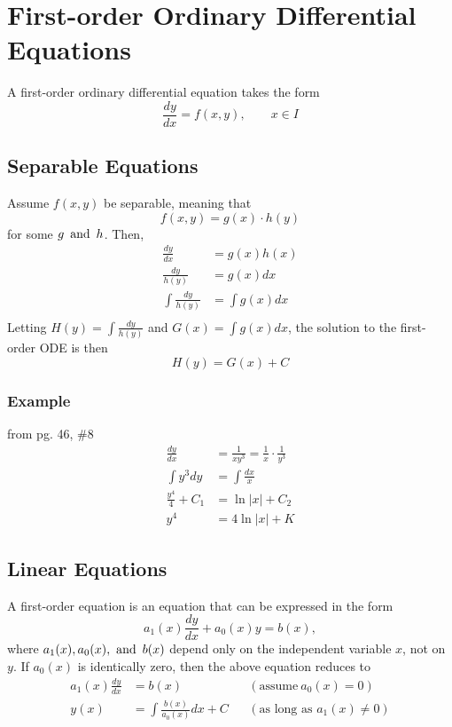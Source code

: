 \section{First-order Ordinary Differential Equations}
A first-order ordinary differential equation takes the form
\[
    \frac{dy}{dx} = f(x,y), \qquad x \in I
\]

\subsection{Separable Equations}
Assume $f(x,y)$ be separable, meaning that
\[
    f(x,y) = g(x)\cdot h(y)
\]
for some $g \operatorname{~\text{and}~} h$. Then,
\begin{align*}
    \frac{dy}{dx} & = g(x)h(x) \\
    \frac{dy}{h(y)} & = g(x)dx \\
    \int \frac{dy}{h(y)} & = \int g(x)dx \\
\end{align*}
Letting $H(y) = \int \frac{dy}{h(y)}$ and $G(x) = \int g(x)dx$, the solution to the first-order ODE is then
\[
    H(y) = G(x) + C
\]

\subsubsection*{Example}
from pg. 46, \#8
\begin{align*}
    \frac{dy}{dx} & = \frac{1}{xy^3} = \frac{1}{x} \cdot \frac{1}{y^3} \\
    \int y^3dy & = \int \frac{dx}{x} \\
    \frac{y^4}{4} + C_1 & = \ln |x| + C_2 \\
    y^4 & = 4\ln |x| + K
\end{align*}

\subsection{Linear Equations}
A  first-order equation is an equation that can be expressed in the form
\[
    a_1(x)\frac{dy}{dx} + a_0(x)y = b(x),
\]
where $a_1(x), a_0(x), \operatorname{~\text{and}~} b(x)$ depend only on the independent variable $x$, not on $y$. If $a_0(x)$ is identically zero, then the above equation reduces to
\begin{align*}
    a_1(x)\frac{dy}{dx} & = b(x) && (\text{assume}~a_0(x) = 0) \\
    y(x) & = \int \frac{b(x)}{a_0(x)}dx + C && (\text{as long as $a_1(x) \neq 0$})
\end{align*}